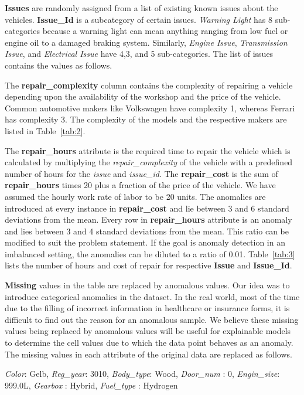 \documentclass{article}
\begin{document}
\textbf{Issues} are randomly assigned from a list of existing known issues about the vehicles. \textbf{Issue\_Id} is a subcategory of certain issues. \textit{Warning Light} has 8 sub-categories because a warning light can mean anything ranging from low fuel or engine oil to a damaged braking system. Similarly, \textit{Engine Issue}, \textit{Transmission Issue}, and \textit{Electrical Issue} have 4,3, and 5 sub-categories. The list of issues contains the values as follows.

The \textbf{repair\_complexity} column contains the complexity of repairing a vehicle depending upon the availability of the workshop and the price of the vehicle. Common automotive makers like Volkswagen have complexity 1, whereas Ferrari has complexity 3. The complexity of the models and the respective makers are listed in Table~\ref{tab:2}.

The \textbf{repair\_hours} attribute is the required time to repair the vehicle which is calculated by multiplying the \textit{repair\_complexity} of the vehicle with a predefined number of hours for the \textit{issue} and \textit{issue\_id}. The \textbf{repair\_cost} is the sum of \textbf{repair\_hours} times 20 plus a fraction of the price of the vehicle. We have assumed the hourly work rate of labor to be 20 units.  The anomalies are introduced at every  instance in \textbf{repair\_cost} and lie between 3 and 6 standard deviations from the mean. Every  row in \textbf{repair\_hours} attribute is an anomaly and lies between 3 and 4 standard deviations from the mean. This ratio can be modified to suit the problem statement. If the goal is anomaly detection in an imbalanced setting, the anomalies can be diluted to a ratio of 0.01.  
Table~\ref{tab:3} lists the number of hours and cost of repair for respective \textbf{Issue} and \textbf{Issue\_Id}. 

\textbf{Missing} values in the table are replaced by anomalous values. Our idea was to introduce categorical anomalies in the dataset. In the real world, most of the time due to the filling of incorrect information in healthcare or insurance forms, it is difficult to find out the reason for an anomalous sample. We believe these missing values being replaced by anomalous values will be useful for explainable models to determine the cell values due to which the data point behaves as an anomaly. The missing values in each attribute of the original data are replaced as follows.

{\textit{Color}: Gelb, \textit{Reg\_year}: 3010, \textit{Body\_type}: Wood, \textit{Door\_num} : 0,
\textit{Engin\_size}: 999.0L, \textit{Gearbox} : Hybrid, \textit{Fuel\_type} : Hydrogen}
\end{document}
